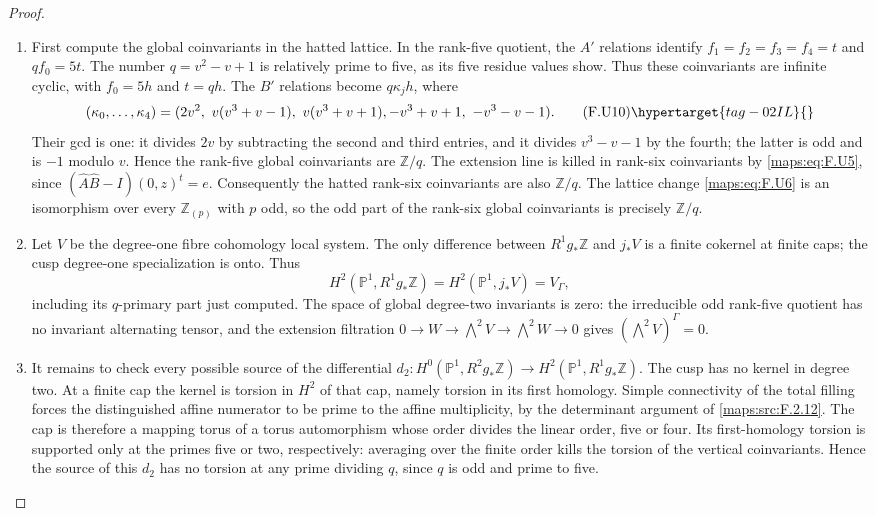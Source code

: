 \begin{proof}
\begin{enumerate}[label={$\langle1\rangle$\arabic*.}]
\item First compute the global coinvariants in the hatted lattice.
In the rank-five quotient, the $A'$ relations identify
$f_1=f_2=f_3=f_4=t$ and $qf_0=5t$.
The number $q=v^2-v+1$ is relatively prime to five, as its
five residue values show.  Thus these coinvariants are
infinite cyclic, with $f_0=5h$ and $t=qh$.
The $B'$ relations become $q\kappa_j h$, where
\[
 (\kappa_0,\ldots,\kappa_4)=
 (2v^2,\ v(v^3+v-1),\ v(v^3+v+1),
       -v^3+v+1,\ -v^3-v-1).
 \tag{F.U10}\hypertarget{tag-02IL}{}\label{maps:eq:F.U10}
\]
Their gcd is one: it divides $2v$ by subtracting the second
and third entries, and it divides $v^3-v-1$ by the fourth;
the latter is odd and is $-1$ modulo $v$.
Hence the rank-five global coinvariants are $\mathbb Z/q$.
The extension line is killed in rank-six coinvariants by
\eqref{maps:eq:F.U5}, since
$(\widehat A\widehat B-I)(0,z)^t=e$.
Consequently the hatted rank-six coinvariants are also
$\mathbb Z/q$.  The lattice change \eqref{maps:eq:F.U6} is an isomorphism
over every $\mathbb Z_{(p)}$ with $p$ odd, so the odd part of
the rank-six global coinvariants is precisely
$\mathbb Z/q$.

\item Let $V$ be the degree-one fibre cohomology local system.
The only difference between $R^1g_*\mathbb Z$ and $j_*V$
is a finite cokernel at finite caps; the cusp degree-one
specialization is onto.  Thus
\[
 H^2(\mathbb P^1,R^1g_*\mathbb Z)
 =H^2(\mathbb P^1,j_*V)=V_\Gamma,
\]
including its $q$-primary part just computed.  The space of
global degree-two invariants is zero: the irreducible odd
rank-five quotient has no invariant alternating tensor,
and the extension filtration
$0\to W\to\bigwedge^2V\to\bigwedge^2W\to0$
gives $(\bigwedge^2V)^\Gamma=0$.

\item It remains to check every possible source of the differential
$d_2:H^0(\mathbb P^1,R^2g_*\mathbb Z)
\to H^2(\mathbb P^1,R^1g_*\mathbb Z)$.
The cusp has no kernel in degree two.  At a finite cap the
kernel is torsion in $H^2$ of that cap, namely torsion in its
first homology.  Simple connectivity of the total filling
forces the distinguished affine numerator to be prime to the
affine multiplicity, by the determinant argument of
\ref{maps:src:F.2.12}.  The cap is therefore a mapping torus of a torus
automorphism whose order divides the linear order, five or
four.  Its first-homology torsion is supported only at the
primes five or two, respectively: averaging over the finite
order kills the torsion of the vertical coinvariants.
Hence the source of this $d_2$ has no torsion at any prime
dividing $q$, since $q$ is odd and prime to five.


\end{enumerate}
\end{proof}

